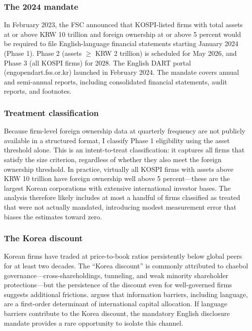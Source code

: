 \documentclass[12pt]{article}
\begin{document}
\subsubsection*{The 2024 mandate} In February 2023, the FSC announced that KOSPI-listed firms with total assets at or above KRW 10 trillion and foreign ownership at or above 5 percent would be required to file English-language financial statements starting January 2024 (Phase 1). Phase 2 (assets $\geq$ KRW 2 trillion) is scheduled for May 2026, and Phase 3 (all KOSPI firms) for 2028. The English DART portal (engopendart.fss.or.kr) launched in February 2024. The mandate covers annual and semi-annual reports, including consolidated financial statements, audit reports, and footnotes.

\subsubsection*{Treatment classification} Because firm-level foreign ownership data at quarterly frequency are not publicly available in a structured format, I classify Phase 1 eligibility using the asset threshold alone. This is an intent-to-treat classification: it captures all firms that satisfy the size criterion, regardless of whether they also meet the foreign ownership threshold. In practice, virtually all KOSPI firms with assets above KRW 10 trillion have foreign ownership well above 5 percent---these are the largest Korean corporations with extensive international investor bases. The analysis therefore likely includes at most a handful of firms classified as treated that were not actually mandated, introducing modest measurement error that biases the estimates toward zero.

\subsubsection*{The Korea discount} Korean firms have traded at price-to-book ratios persistently below global peers for at least two decades. The ``Korea discount'' is commonly attributed to chaebol governance---cross-shareholdings, tunneling, and weak minority shareholder protections---but the persistence of the discount even for well-governed firms suggests additional frictions. \citet{stulz2005} argues that information barriers, including language, are a first-order determinant of international capital allocation. If language barriers contribute to the Korea discount, the mandatory English disclosure mandate provides a rare opportunity to isolate this channel.
\end{document}
